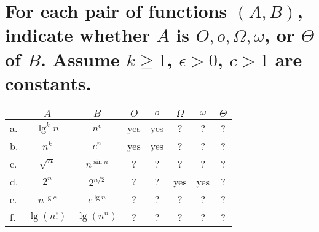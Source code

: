 \section[Problem 5]{For each pair of functions $(A, B)$, indicate whether $A$ is $O, o, \Omega, \omega$, or $\Theta$ of $B$. Assume $k \geq 1$, $\epsilon > 0$, $c > 1$ are constants.}
\begin{center}
	\begin{tabular}{lcc|c|c|c|c|c}
		& $A$ & $B$ & $O$ & $o$ & $\Omega$ & $\omega$ & $\Theta$ \\ \hline
		a. & $\lg^k n$ & $n^{\epsilon}$ & yes & yes & ? & ? & ? \\ \hline
		b. & $n^k$ & $c^n$				& yes & yes & ? & ? & ? \\ \hline
		c. & $\sqrt{n}$ & $n^{\sin n}$	& ? & ? & ? & ? & ? \\ \hline
		d. & $2^n$ & $2^{n/2}$			& ? & ? & yes & yes & ? \\ \hline
		e. & $n^{\lg c}$ & $c^{\lg n}$	& ? & ? & ? & ? & ? \\ \hline
		f. & $\lg(n!)$ & $\lg(n^n)$		& ? & ? & ? & ? & ? 
	\end{tabular}
\end{center}


